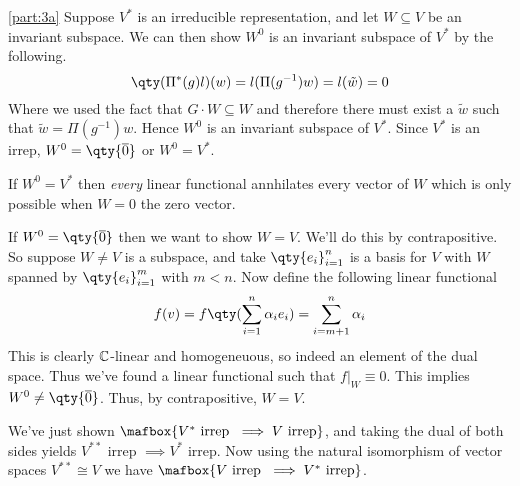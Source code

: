 \documentclass[
	pages,
	boxes,
	color=WildStrawberry
]{homework}
\begin{document}
\begin{solution}
	\ref{part:3a}
	Suppose $V^*$ is an irreducible representation, and let $W\subseteq V$ be an invariant subspace. We can then show $W^0$ is an invariant subspace of $V^*$ by the following.
	\begin{equation*}
		\qty(\Pi^*(g)l)(w) = l(\Pi(g^{-1}) w) = l(\tilde{w}) = 0
	\end{equation*}
	Where we used the fact that $G\cdot W\subseteq W$ and therefore there must exist a $\tilde{w}$ such that $\tilde{w} = \Pi(g^{-1})w$. Hence $W^0$ is an invariant subspace of $V^*$. Since $V^*$ is an irrep, $W^0 = \qty{\overline{0}}$ or $W^0 = V^*$.

	If $W^0 = V^*$ then \emph{every} linear functional annhilates every vector of $W$ which is only possible when $W = \qty{0}$ the zero vector.

	If $W^0 = \qty{\overline{0}}$ then we want to show $W = V$. We'll do this by contrapositive. So suppose $W \neq V$ is a subspace, and take $\qty{e_i}_{i = 1}^n$ is a basis for $V$ with $W$ spanned by $\qty{e_i}_{i = 1}^m$ with $m < n$. Now define the following linear functional
	\begin{equation*}
		f(v) = f\qty(\sum_{i = 1}^n\alpha_i e_i) = \sum_{i = m + 1}^n \alpha_i
	\end{equation*}
	This is clearly $\mathbb{C}$-linear and homogeneuous, so indeed an element of the dual space. Thus we've found a linear functional such that $f|_W \equiv 0$. This implies $W^0 \neq \qty{\overline{0}}$. Thus, by contrapositive, $W = V$.

	We've just shown $\mafbox{V^*\text{ irrep }\implies V\text{ irrep}}$, and taking the dual of both sides yields $V^{**}$ irrep $\implies V^*$ irrep. Now using the natural isomorphism of vector spaces $V^{**}\cong V$ we have $\mafbox{V\text{ irrep }\implies V^*\text{ irrep}}$.


\end{solution}
\end{document}
